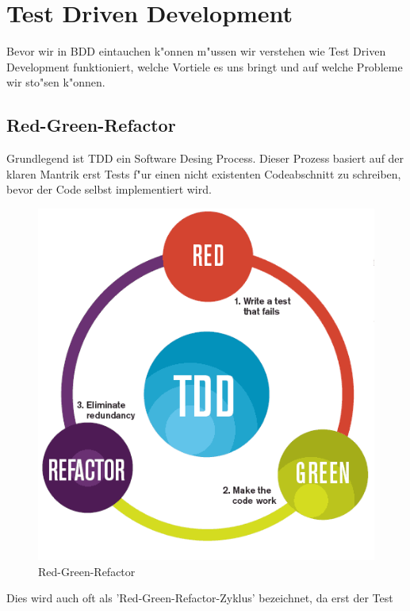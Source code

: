 \section{Test Driven Development}
  Bevor wir in BDD eintauchen k"onnen m"ussen wir verstehen wie Test Driven 
  Development funktioniert, welche Vortiele es uns bringt und auf welche 
  Probleme wir sto"sen k"onnen.

  \subsection{Red-Green-Refactor}
    Grundlegend ist TDD ein Software Desing Process. Dieser Prozess basiert auf 
    der klaren Mantrik erst Tests f"ur einen nicht existenten Codeabschnitt zu
    schreiben, bevor der Code selbst implementiert wird.\\
    \begin{figure}
      \vspace{-30pt}
      \begin{center}
        \includegraphics[scale=0.3]{assets/tdd_flow.png}
      \end{center}
      \caption{Red-Green-Refactor\cite{Osorio:2012}}
      \vspace{-15pt}
    \end{figure}
    Dies wird auch oft als 'Red-Green-Refactor-Zyklus' bezeichnet, da erst der Test
